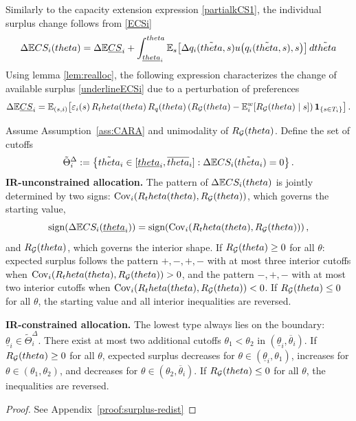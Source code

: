 \documentclass{class}
\begin{document}
Similarly to the capacity extension expression \ref{partialkCS1}, the individual surplus change follows from \ref{ECSi}
\begin{equation*}
\Delta \mathbb{E} CS_i(theta)  = \Delta \mathbb{E}\underline{CS}_i + \int_{\underline{theta}_i}^{theta} \mathbb{E}_s\!\left[\Delta q_i(\tilde{theta},s) u\!\left(q_i(\tilde{theta},s),s\right)\right]d\tilde{theta}
\end{equation*}
Using lemma \ref{lem:realloc}, the following expression characterizes the change of available surplus \ref{underlineECSi} due to a perturbation of preferences
\[
\Delta\mathbb{E}\underline{CS}_i =\mathbb{E}_{(s,i)}\!\left[\varepsilon_i(s)\,R_theta(theta)\,R_q(theta)\left(R_{\mathcal{G}}(theta)-\mathbb{E}_i^w\!\left[R_{\mathcal{G}}(theta)\mid s\right]\right)\mathbf{1}_{\{s\in T_i\}}\right].
\]
\begin{proposition}\label{prop:surplus-redist}
Assume Assumption~\ref{ass:CARA} and unimodality of $R_{\mathcal{G}}(theta)$. Define the set of cutoffs
\[
\tilde\Theta_i^\Delta := \left\{\tilde{theta}_i\in[\underline{theta}_i,\overline{theta}_i] : \Delta\mathbb{E} CS_i(\tilde{theta}_i)=0\right\}.
\]
\noindent\textbf{IR-unconstrained allocation.} The pattern of $\Delta\mathbb{E} CS_i(theta)$ is jointly determined by two signs: $\mathrm{Cov}_{i}(R_theta(theta),R_{\mathcal{G}}(theta))$, which governs the starting value, \[\textnormal{sign}\!\left(\Delta\mathbb{E} CS_i(\underline{theta}_i)\right)=\textnormal{sign}\!\left(\mathrm{Cov}_{i}(R_theta(theta),R_{\mathcal{G}}(theta))\right),\] and $R_{\mathcal{G}}(theta)$, which governs the interior shape. If $R_{\mathcal{G}}(theta)\ge 0$ for all $\theta$: expected surplus follows the pattern $+,-,+,-$ with at most three interior cutoffs when $\mathrm{Cov}_{i}(R_theta(theta),R_{\mathcal{G}}(theta))>0$, and the pattern $-,+,-$ with at most two interior cutoffs when $\mathrm{Cov}_{i}(R_theta(theta),R_{\mathcal{G}}(theta))<0$. If $R_{\mathcal{G}}(theta)\le 0$ for all $\theta$, the starting value and all interior inequalities are reversed.

\noindent\textbf{IR-constrained allocation.} The lowest type always lies on the boundary: $\underline\theta_i\in\tilde\Theta_i^\Delta$. There exist at most two additional cutoffs $\theta_1<\theta_2$ in $(\underline\theta_i,\overline\theta_i)$. If $R_{\mathcal{G}}(theta)\ge 0$ for all $\theta$, expected surplus decreases for $\theta\in(\underline\theta_i,\theta_1)$, increases for $\theta\in(\theta_1,\theta_2)$, and decreases for $\theta\in(\theta_2,\overline\theta_i)$. If $R_{\mathcal{G}}(theta)\le 0$ for all $\theta$, the inequalities are reversed.
\end{proposition}
\begin{proof}
    See Appendix~\ref{proof:surplus-redist}
\end{proof}
\end{document}
